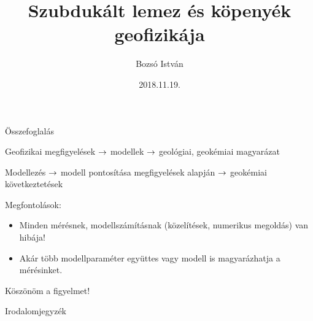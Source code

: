 \documentclass{beamer}
\title[Szubdukált lemez geofizikája]{Szubdukált lemez és köpenyék geofizikája}
\author{Bozsó István}
\institute[MTA CSFK GGI]{MTA CSFK Geodéziai és Geofzikai Intézet}
\date{2018.11.19.}
\begin{document}
\begin{frame}
    \titlepage
\end{frame}








\begin{frame}{Összefoglalás}

    {\Large
    Geofizikai megfigyelések $\rightarrow$ modellek $\rightarrow$ geológiai, geokémiai magyarázat
    \vspace{20pt}
    
    Modellezés $\rightarrow$ modell pontosítása megfigyelések alapján $\rightarrow$ geokémiai következtetések
    }
    \vspace{20pt}
    
    Megfontolások:
    \begin{itemize}
        \item Minden mérésnek, modellszámításnak (közelítések, numerikus megoldás) van hibája!
        \item Akár több modellparaméter együttes vagy modell is magyarázhatja a mérésinket.
    \end{itemize}
\end{frame}


\begin{frame}
    \begin{center}
        \Huge \color{blue!55!black}
        Köszönöm a figyelmet!
    \end{center}
\end{frame}


\begin{frame}{Irodalomjegyzék}
    {\tiny
    
    }
\end{frame}
\end{document}
